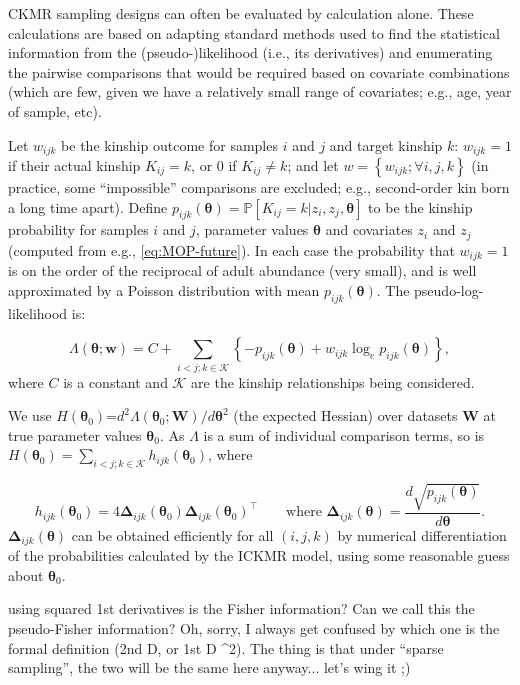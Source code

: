CKMR sampling designs can often be evaluated by calculation alone.
These calculations are based on adapting standard methods used to
find the statistical information from the (pseudo-)likelihood (i.e.,
its derivatives) and enumerating the pairwise comparisons that would
be required based on covariate combinations (which are few, given
we have a relatively small range of covariates; e.g., age, year of
sample, etc).

Let $w_{ijk}$ be the kinship outcome for samples $i$ and $j$ and
target kinship $k$: $w_{ijk}=1$ if their actual kinship $K_{ij}=k$,
or 0 if $K_{ij}\neq k$; and let $w=\left\{ w_{ijk};\forall i,j,k\right\} $
(in practice, some ``impossible'' comparisons are excluded; e.g.,
second-order kin born a long time apart). Define $p_{ijk}\left(\boldsymbol{\theta}\right)=\mathbb{P}\left[K_{ij}=k\vert z_{i},z_{j},\boldsymbol{\theta}\right]$
to be the kinship probability for samples $i$ and $j$, parameter
values $\boldsymbol{\theta}$ and covariates $z_{i}$ and $z_{j}$
(computed from e.g., \eqref{eq:MOP-future}). In each case the probability
that $w_{ijk}=1$ is on the order of the reciprocal of adult abundance
(very small), and is well approximated by a Poisson distribution with
mean $p_{ijk}\left(\boldsymbol{\theta}\right)$. The pseudo-log-likelihood
is:

\[
\Lambda\left(\boldsymbol{\theta};\mathbf{w}\right)=C+\sum_{i<j;k\in\mathcal{K}}\left\{ -p_{ijk}\left(\boldsymbol{\theta}\right)+w_{ijk}\log_{e}p_{ijk}\left(\boldsymbol{\theta}\right)\right\} ,
\]
where $C$ is a constant and $\mathcal{K}$ are the kinship relationships
being considered.

We use $H\left(\boldsymbol{\theta}_{0}\right)$=$d^{2}\Lambda\left(\boldsymbol{\theta}_{0};\mathbf{W}\right)/d\boldsymbol{\theta}^{2}$
(the expected Hessian) over datasets $\mathbf{W}$ at true parameter
values $\boldsymbol{\theta}_{0}$. As $\Lambda$ is a sum of individual
comparison terms, so is $H\left(\boldsymbol{\theta}_{0}\right)=\sum_{i<j;k\in\mathcal{K}}h_{ijk}\left(\boldsymbol{\theta}_{0}\right)$,
where

\[
h_{ijk}\left(\boldsymbol{\theta}_{0}\right)=4\boldsymbol{\Delta}_{ijk}\left(\boldsymbol{\theta}_{0}\right)\boldsymbol{\Delta}_{ijk}\left(\boldsymbol{\theta}_{0}\right)^{\top}\qquad\text{where }\boldsymbol{\Delta}_{ijk}\left(\boldsymbol{\theta}\right)=\frac{d\sqrt{p_{ijk}\left(\boldsymbol{\theta}\right)}}{d\boldsymbol{\theta}}.
\]
$\boldsymbol{\Delta}_{ijk}\left(\boldsymbol{\theta}\right)$ can be
obtained efficiently for all $(i,j,k)$ by numerical differentiation
of the probabilities calculated by the ICKMR model, using some reasonable
guess about $\boldsymbol{\theta}_{0}$. %
\begin{lyxgreyedout}
using squared 1st derivatives is the Fisher information? Can we call
this the pseudo-Fisher information? Oh, sorry, I always get confused
by which one is the formal definition (2nd D, or 1st D \textasciicircum 2).
The thing is that under ``sparse sampling'', the two will be the
same here anyway... let's wing it ;)%
\end{lyxgreyedout}

